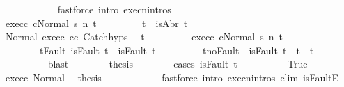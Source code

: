\begin{isabellebody}
\ \ \ \ \ \ \ \ \ \ \isamarkupfalse%
\ {\isacharparenleft}fastforce\ intro{\isacharcolon}\ execn{\isachardot}intros\ {\isacharparenright}\isanewline
\ \ \ \ \ \ \isamarkupfalse%
\isanewline
\ \ \ \ \isamarkupfalse%
\isanewline
\ \ \ \ \ \ \isamarkupfalse%
\ exec{\isacharunderscore}c{}{\isacharcolon}\ {\isachardoublequoteopen}{\isasymGamma}{\isasymturnstile}{\isasymlangle}c{}{\isacharcomma}Normal\ s{\isacharprime}{\isasymrangle}\ {\isacharequal}n{\isasymRightarrow}\ t{\isachardoublequoteclose}\ \isanewline
\ \ \ \ \ \ \isamarkupfalse%
\ t{\isacharcolon}\ {\isachardoublequoteopen}{\isasymnot}\ isAbr\ t{\isachardoublequoteclose}\isanewline
\ \ \ \ \ \ \isamarkupfalse%
\ Normal\ exec{\isacharunderscore}c{}\ c{}{\isacharunderscore}c{}{\isacharprime}\ Catch{\isachardot}hyps\ \isamarkupfalse%
\ t{\isacharprime}\ \isanewline
\ \ \ \ \ \ \ \ exec{\isacharunderscore}c{}{\isacharprime}{\isacharcolon}\ {\isachardoublequoteopen}{\isasymGamma}{\isasymturnstile}{\isasymlangle}c{}{\isacharprime}{\isacharcomma}Normal\ s{\isacharprime}{\isasymrangle}\ {\isacharequal}n{\isasymRightarrow}\ t{\isacharprime}{\isachardoublequoteclose}\ \isanewline
\ \ \ \ \ \ \ \ t{\isacharunderscore}Fault{\isacharcolon}\ {\isachardoublequoteopen}isFault\ t\ {\isasymlongrightarrow}\ isFault\ t{\isacharprime}{\isachardoublequoteclose}\ \isanewline
\ \ \ \ \ \ \ \ t{\isacharprime}{\isacharunderscore}noFault{\isacharcolon}\ {\isachardoublequoteopen}{\isasymnot}\ isFault\ t{\isacharprime}\ {\isasymlongrightarrow}\ t{\isacharprime}\ {\isacharequal}\ t{\isachardoublequoteclose}\isanewline
\ \ \ \ \ \ \ \ \isamarkupfalse%
\ blast\isanewline
\ \ \ \ \ \ \isamarkupfalse%
\ {\isacharquery}thesis\isanewline
\ \ \ \ \ \ \isamarkupfalse%
\ {\isacharparenleft}cases\ {\isachardoublequoteopen}isFault\ t{\isacharprime}{\isachardoublequoteclose}{\isacharparenright}\isanewline
\ \ \ \ \ \ \ \ \isamarkupfalse%
\ True\isanewline
\ \ \ \ \ \ \ \ \isamarkupfalse%
\ exec{\isacharunderscore}c{}{\isacharprime}\ Normal\ \isamarkupfalse%
\ {\isacharquery}thesis\isanewline
\ \ \ \ \ \ \ \ \ \ \isamarkupfalse%
\ {\isacharparenleft}fastforce\ intro{\isacharcolon}\ execn{\isachardot}intros\ elim{\isacharcolon}\ isFaultE{\isacharparenright}\isanewline

\end{isabellebody}
